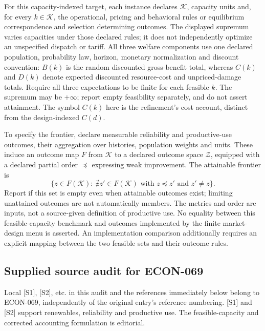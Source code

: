 \documentclass[11pt,a4paper]{article}
\begin{document}
For this capacity-indexed target, each instance declares \(\mathcal K\), capacity units and, for every \(k\in\mathcal K\), the operational, pricing and behavioral rules or equilibrium correspondence and selection determining outcomes. The displayed supremum varies capacities under those declared rules; it does not independently optimize an unspecified dispatch or tariff. All three welfare components use one declared population, probability law, horizon, monetary normalization and discount convention: \(B(k)\) is the random discounted gross-benefit total, whereas \(C(k)\) and \(D(k)\) denote expected discounted resource-cost and unpriced-damage totals. Require all three expectations to be finite for each feasible \(k\). The supremum may be \(+\infty\); report empty feasibility separately, and do not assert attainment. The symbol \(C(k)\) here is the refinement's cost account, distinct from the design-indexed \(C(d)\).

To specify the frontier, declare measurable reliability and productive-use outcomes, their aggregation over histories, population weights and units. These induce an outcome map \(F\) from \(\mathcal K\) to a declared outcome space \(\mathcal Z\), equipped with a declared partial order \(\preceq\) expressing weak improvement. The attainable frontier is
\[
 \{z\in F(\mathcal K):\ \nexists z'\in F(\mathcal K)\text{ with }z\preceq z'\text{ and }z'\ne z\}.
\]
Report if this set is empty even when attainable outcomes exist; limiting unattained outcomes are not automatically members. The metrics and order are inputs, not a source-given definition of productive use. No equality between this feasible-capacity benchmark and outcomes implemented by the finite market-design menu is asserted. An implementation comparison additionally requires an explicit mapping between the two feasible sets and their outcome rules.
\subsection*{Supplied source audit for ECON-069}
Local [S1], [S2], etc. in this audit and the references immediately below
belong to ECON-069, independently of the original entry's reference numbering.
[S1] and [S2] support renewables, reliability and productive use. The feasible-capacity and corrected accounting formulation is editorial.
\end{document}
